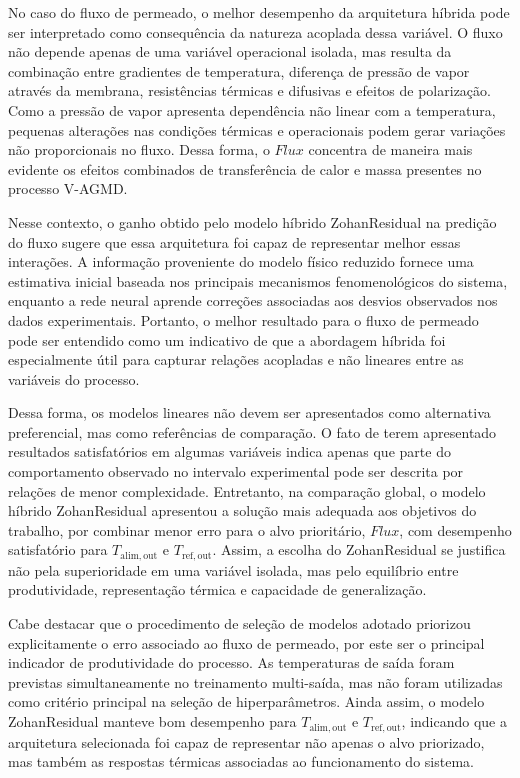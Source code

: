 No caso do fluxo de permeado, o melhor desempenho da arquitetura híbrida pode ser interpretado como consequência da natureza acoplada dessa variável. O fluxo não depende apenas de uma variável operacional isolada, mas resulta da combinação entre gradientes de temperatura, diferença de pressão de vapor através da membrana, resistências térmicas e difusivas e efeitos de polarização. Como a pressão de vapor apresenta dependência não linear com a temperatura, pequenas alterações nas condições térmicas e operacionais podem gerar variações não proporcionais no fluxo. Dessa forma, o $Flux$ concentra de maneira mais evidente os efeitos combinados de transferência de calor e massa presentes no processo V-AGMD.

Nesse contexto, o ganho obtido pelo modelo híbrido ZohanResidual na predição do fluxo sugere que essa arquitetura foi capaz de representar melhor essas interações. A informação proveniente do modelo físico reduzido fornece uma estimativa inicial baseada nos principais mecanismos fenomenológicos do sistema, enquanto a rede neural aprende correções associadas aos desvios observados nos dados experimentais. Portanto, o melhor resultado para o fluxo de permeado pode ser entendido como um indicativo de que a abordagem híbrida foi especialmente útil para capturar relações acopladas e não lineares entre as variáveis do processo.

Dessa forma, os modelos lineares não devem ser apresentados como alternativa preferencial, mas como referências de comparação. O fato de terem apresentado resultados satisfatórios em algumas variáveis indica apenas que parte do comportamento observado no intervalo experimental pode ser descrita por relações de menor complexidade. Entretanto, na comparação global, o modelo híbrido ZohanResidual apresentou a solução mais adequada aos objetivos do trabalho, por combinar menor erro para o alvo prioritário, $Flux$, com desempenho satisfatório para $T_{\mathrm{alim,out}}$ e $T_{\mathrm{ref,out}}$. Assim, a escolha do ZohanResidual se justifica não pela superioridade em uma variável isolada, mas pelo equilíbrio entre produtividade, representação térmica e capacidade de generalização.

Cabe destacar que o procedimento de seleção de modelos adotado priorizou explicitamente o erro associado ao fluxo de permeado, por este ser o principal indicador de produtividade do processo. As temperaturas de saída foram previstas simultaneamente no treinamento multi-saída, mas não foram utilizadas como critério principal na seleção de hiperparâmetros. Ainda assim, o modelo ZohanResidual manteve bom desempenho para $T_{\mathrm{alim,out}}$ e $T_{\mathrm{ref,out}}$, indicando que a arquitetura selecionada foi capaz de representar não apenas o alvo priorizado, mas também as respostas térmicas associadas ao funcionamento do sistema.

